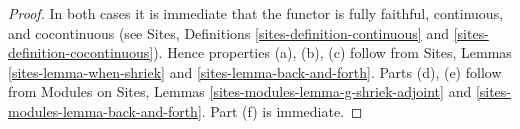 \documentclass[10pt,a4paper]{amsart}
\theoremstyle{plain}
\theoremstyle{definition}
\theoremstyle{remark}
\numberwithin{equation}{subsection}
\begin{document}
\begin{proof}
In both cases it is immediate that the functor is fully faithful,
continuous, and cocontinuous (see
Sites, Definitions \ref{sites-definition-continuous} and
\ref{sites-definition-cocontinuous}).
Hence properties (a), (b), (c) follow from
Sites, Lemmas \ref{sites-lemma-when-shriek} and
\ref{sites-lemma-back-and-forth}.
Parts (d), (e) follow from
Modules on Sites, Lemmas \ref{sites-modules-lemma-g-shriek-adjoint} and
\ref{sites-modules-lemma-back-and-forth}.
Part (f) is immediate.
\end{proof}
\end{document}
